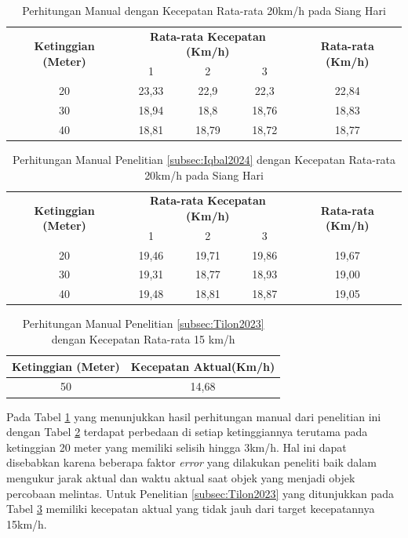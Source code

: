 \begin{table}[H]
	\caption{Perhitungan Manual dengan Kecepatan Rata-rata 20km/h pada Siang Hari}
    \label{table:20km/h-siang-manual}
	\centering
	\begin{tabular}{|c|c|c|c|c|}
		\hline
		\multirow{2}{*}{\textbf{Ketinggian (Meter)}} & \multicolumn{3}{c|}{\textbf{Rata-rata Kecepatan (Km/h)}} & \multirow{2}{*}{\textbf{Rata-rata (Km/h)}} \\ \cline{2-4}
		& 1 & 2 & 3 & \\ \hline
		20 & 23,33 & 22,9 & 22,3 & 22,84 \\
		30 & 18,94 & 18,8 & 18,76 & 18,83 \\
		40 & 18,81 & 18,79 & 18,72 & 18,77 \\ \hline
	\end{tabular}
\end{table}
\vspace{-10pt}
\begin{table}[H]
	\caption{Perhitungan Manual Penelitian \ref{subsec:Iqbal2024} dengan Kecepatan Rata-rata 20km/h pada Siang Hari}
    \label{table:20km/h-siang-manual-iqbal}
	\centering
	\begin{tabular}{|c|c|c|c|c|}
		\hline
		\multirow{2}{*}{\textbf{Ketinggian (Meter)}} & \multicolumn{3}{c|}{\textbf{Rata-rata Kecepatan (Km/h)}} & \multirow{2}{*}{\textbf{Rata-rata (Km/h)}} \\ \cline{2-4}
		& 1 & 2 & 3 & \\ \hline
		20 & 19,46 & 19,71 & 19,86 & 19,67 \\
		30 & 19,31 & 18,77 & 18,93 & 19,00 \\
		40 & 19,48 & 18,81 & 18,87 & 19,05 \\ \hline
	\end{tabular}
\end{table}
\vspace{-10pt}
\begin{table}[H]
	\caption{Perhitungan Manual Penelitian \ref{subsec:Tilon2023} dengan Kecepatan Rata-rata 15 km/h}
    \label{table:15kmh-manual-Tilon}
	\centering
	\begin{tabular}{|c|c|}
		\hline
		\textbf{Ketinggian (Meter)} & \textbf{Kecepatan Aktual(Km/h)}\\ \hline
		50 & 14,68 \\ \hline
	\end{tabular}
\end{table}

Pada Tabel \ref{table:20km/h-siang-manual} yang menunjukkan hasil perhitungan manual dari penelitian ini dengan Tabel \ref{table:20km/h-siang-manual-iqbal} terdapat perbedaan di setiap ketinggiannya terutama pada ketinggian 20 meter yang memiliki selisih hingga 3km/h. Hal ini dapat disebabkan karena beberapa faktor \emph{error} yang dilakukan peneliti baik dalam mengukur jarak aktual dan waktu aktual saat objek yang menjadi objek percobaan melintas. Untuk Penelitian \ref{subsec:Tilon2023} yang ditunjukkan pada Tabel \ref{table:15kmh-manual-Tilon} memiliki kecepatan aktual yang tidak jauh dari target kecepatannya 15km/h.

